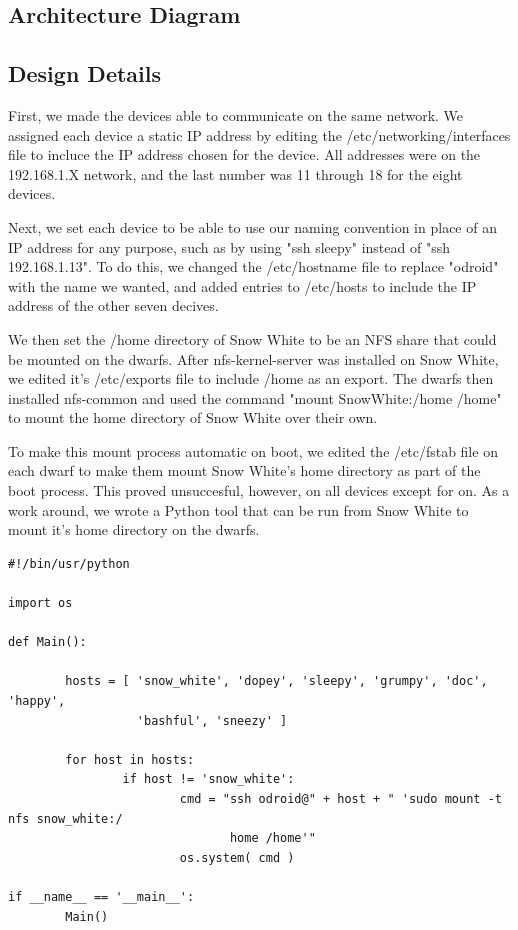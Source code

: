 \subsection{ Architecture  Diagram}



\subsection{Design Details}
First, we made the devices able to communicate on the same network. We assigned each device a static IP address by editing the /etc/networking/interfaces file to incluce the IP address chosen for the device. All addresses were on the 192.168.1.X network, and the last number was 11 through 18 for the eight devices.

Next, we set each device to be able to use our naming convention in place of an IP address for any purpose, such as by using "ssh sleepy" instead of "ssh 192.168.1.13". To do this, we changed the /etc/hostname file to replace "odroid" with the name we wanted, and added entries to /etc/hosts to include the IP address of the other seven decives. 

We then set the /home directory of Snow White to be an NFS share that could be mounted on the dwarfs. After nfs-kernel-server was installed on Snow White, we edited it's /etc/exports file to include /home as an export. The dwarfs then installed nfs-common and used the command "mount SnowWhite:/home /home" to mount the home directory of Snow White over their own.

To make this mount process automatic on boot, we edited the /etc/fstab file on each dwarf to make them mount Snow White's home directory as part of the boot process. This proved unsuccesful, however, on all devices except for on. As a work around, we wrote a Python tool that can be run from Snow White to mount it's home directory on the dwarfs.

\begin{lstlisting}
#!/bin/usr/python

import os

def Main():

        hosts = [ 'snow_white', 'dopey', 'sleepy', 'grumpy', 'doc', 'happy',
 				  'bashful', 'sneezy' ]

        for host in hosts:
                if host != 'snow_white':
                        cmd = "ssh odroid@" + host + " 'sudo mount -t nfs snow_white:/
							   home /home'"
                        os.system( cmd )

if __name__ == '__main__':
        Main()
\end{lstlisting}

